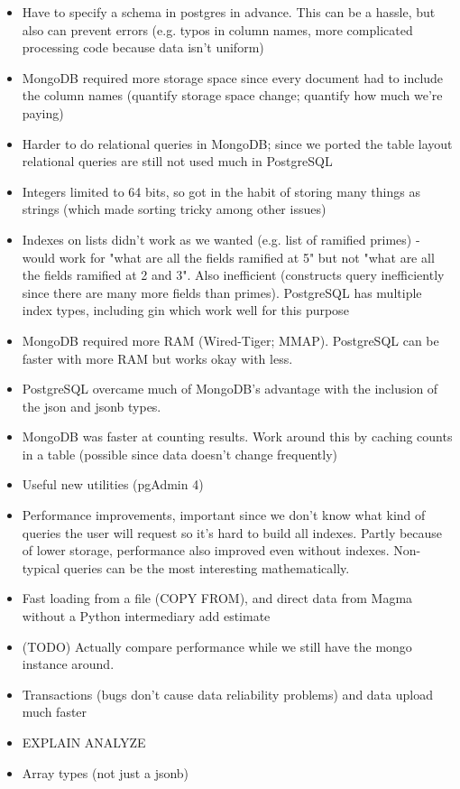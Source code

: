 \documentclass{article}
\begin{document}
\begin{itemize}
\item Have to specify a schema in postgres in advance.  This can be a hassle, but also can prevent errors (e.g. typos in column names, more complicated processing code because data isn't uniform)
\item MongoDB required more storage space since every document had to include the column names (quantify storage space change; quantify how much we're paying)
\item Harder to do relational queries in MongoDB; since we ported the table layout relational queries are still not used much in PostgreSQL
\item Integers limited to 64 bits, so got in the habit of storing many things as strings (which made sorting tricky among other issues)
\item Indexes on lists didn't work as we wanted (e.g. list of ramified primes) - would work for "what are all the fields ramified at 5" but not "what are all the fields ramified at 2 and 3".  Also inefficient (constructs query inefficiently since there are many more fields than primes).  PostgreSQL has multiple index types, including gin which work well for this purpose
\item MongoDB required more RAM (Wired-Tiger; MMAP). PostgreSQL can be faster with more RAM but works okay with less.
\item PostgreSQL overcame much of MongoDB's advantage with the inclusion of the json and jsonb types.
\item MongoDB was faster at counting results.  Work around this by caching counts in a table (possible since data doesn't change frequently)
\item Useful new utilities (pgAdmin 4)
\item Performance improvements, important since we don't know what kind of queries the user will request so it's hard to build all indexes.  Partly because of lower storage, performance also improved even without indexes.  Non-typical queries can be the most interesting mathematically.
\item Fast loading from a file (COPY FROM), and direct data from Magma without a Python intermediary
  add estimate
\item (TODO) Actually compare performance while we still have the mongo instance around.
\item Transactions (bugs don't cause data reliability problems) and data upload much faster
\item EXPLAIN ANALYZE
\item Array types (not just a jsonb)
\end{itemize}
\end{document}
